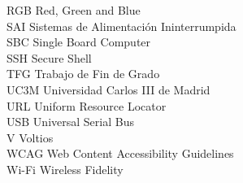 \begin{tabbing}
	RGB \> Red, Green and Blue \\
	SAI \> Sistemas de Alimentación Ininterrumpida \\
	SBC \> Single Board Computer \\
	SSH \> Secure Shell \\
	TFG \> Trabajo de Fin de Grado \\
	UC3M \> Universidad Carlos III de Madrid \\
	URL \> Uniform Resource Locator \\
	USB \> Universal Serial Bus \\
	V \> Voltios \\
	WCAG \> Web Content Accessibility Guidelines \\
	Wi-Fi \> Wireless Fidelity
\end{tabbing}

\newpage %
\thispagestyle{empty}
\mbox{}